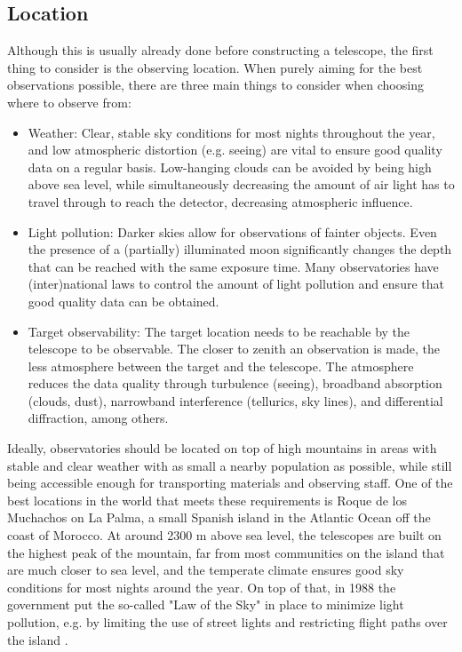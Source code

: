 \documentclass[a4paper,oneside,12pt, class=Latex/Classes/PhDthesisPSnPDF, crop=false]{standalone}
\begin{document}
\subsection{Location}
Although this is usually already done before constructing a telescope, the first thing to consider is the observing location. When purely aiming for the best observations possible, there are three main things to consider when choosing where to observe from:
\begin{itemize}
    \item {Weather: Clear, stable sky conditions for most nights throughout the year, and low atmospheric distortion (e.g. seeing) are vital to ensure good quality data on a regular basis. Low-hanging clouds can be avoided by being high above sea level, while simultaneously decreasing the amount of air light has to travel through to reach the detector, decreasing atmospheric influence.}
    \item {Light pollution: Darker skies allow for observations of fainter objects. Even the presence of a (partially) illuminated moon significantly changes the depth that can be reached with the same exposure time. Many observatories have (inter)national laws to control the amount of light pollution and ensure that good quality data can be obtained.}
    \item {Target observability: The target location needs to be reachable by the telescope to be observable. The closer to zenith an observation is made, the less atmosphere between the target and the telescope. The atmosphere reduces the data quality through turbulence (seeing), broadband absorption (clouds, dust), narrowband interference (tellurics, sky lines), and differential diffraction, among others.}
\end{itemize}

Ideally, observatories should be located on top of high mountains in areas with stable and clear weather with as small a nearby population as possible, while still being accessible enough for transporting materials and observing staff. One of the best locations in the world that meets these requirements is Roque de los Muchachos on La Palma, a small Spanish island in the Atlantic Ocean off the coast of Morocco. At around 2300 m above sea level, the telescopes are built on the highest peak of the mountain, far from most communities on the island that are much closer to sea level, and the temperate climate ensures good sky conditions for most nights around the year. On top of that, in 1988 the government put the so-called "Law of the Sky" in place to minimize light pollution, e.g. by limiting the use of street lights and restricting flight paths over the island \citep{LP_Sky_law}.
\end{document}
